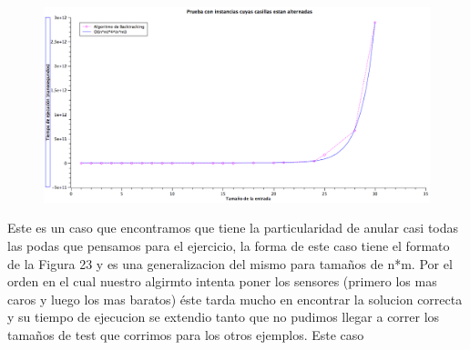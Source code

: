 \begin{figure}[H] %
\begin{center}
\includegraphics[width=460pt]{../imgs/graficoej3_alternado.png}
\end{center}
\end{figure}

Este es un caso que encontramos que tiene la particularidad de anular casi todas las podas que pensamos para el ejercicio, la forma de este caso tiene el formato de la Figura 23 y es una generalizacion del mismo para tamaños de n*m. Por el orden en el cual nuestro algirmto intenta poner los sensores (primero los mas caros y luego los mas baratos) éste tarda mucho en encontrar la solucion correcta y su tiempo de ejecucion se extendio tanto que no pudimos llegar a correr los tamaños de test que corrimos para los otros ejemplos. Este caso 

